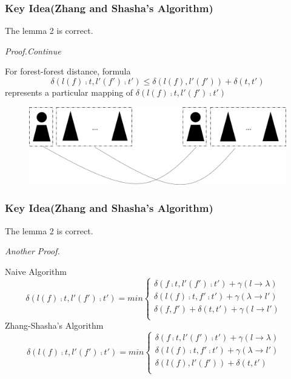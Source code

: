 \documentclass{beamer}
\begin{document}
\begin{frame}
\frametitle{Key Idea(Zhang and Shasha's Algorithm)}
The lemma 2 is correct.

\emph{Proof.Continue}

For forest-forest distance, formula 
\begin{displaymath}
\delta(l(f) \comp t, l'(f') \comp t') \leq \delta(l(f), l'(f')) + \delta(t, t')
\end{displaymath}
represents a particular mapping of $\delta(l(f) \comp t, l'(f') \comp t')$
\begin{figure}
	\includegraphics[width=0.8\linewidth]{forestforest}
	\label{Forest-Forest Distance} 
	\centering
\end{figure}
\end{frame}

\begin{frame}
\frametitle{Key Idea(Zhang and Shasha's Algorithm)}
The lemma 2 is correct.

\emph{Another Proof.}

Naive Algorithm
\begin{displaymath}
\delta(l(f) \comp t, l'(f') \comp t') = min \begin{cases}
	  \delta(f \comp t, l'(f') \comp t') + \gamma(l \to \lambda) \\ %
      \delta(l(f) \comp t, f' \comp t') + \gamma(\lambda \to l') \\ %
     \delta(f, f') + \delta(t, t') + \gamma(l \to l') & \\ %
      \end{cases}
\end{displaymath}
Zhang-Shasha's Algorithm
\begin{displaymath}
\delta(l(f) \comp t, l'(f') \comp t') = min \begin{cases}
	  \delta(f \comp t, l'(f') \comp t') + \gamma(l \to \lambda) \\ %
      \delta(l(f) \comp t, f' \comp t') + \gamma(\lambda \to l') \\ %
     \delta(l(f), l'(f')) + \delta(t, t')& \\ %
      \end{cases}
\end{displaymath}
\end{frame}
\end{document}
